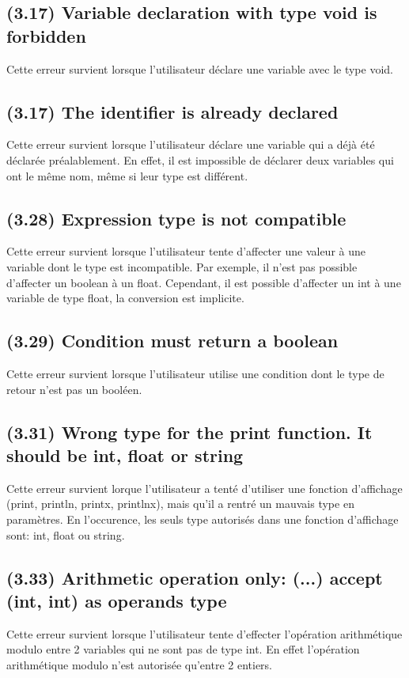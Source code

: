 \documentclass[12pt, a4paper, one side]{article}
\begin{document}
\subsection{(3.17) Variable declaration with type void is forbidden}
Cette erreur survient lorsque l'utilisateur déclare une variable avec le type void.

\subsection{(3.17) The identifier is already declared}
Cette erreur survient lorsque l'utilisateur déclare une variable qui a déjà été déclarée préalablement. En effet, il est impossible de déclarer deux variables qui ont le même nom, même si leur type est différent.

\subsection{(3.28) Expression type is not compatible}
Cette erreur survient lorsque l'utilisateur tente d'affecter une valeur à une variable dont le type est incompatible. Par exemple, il n'est pas possible d'affecter un boolean à un float. Cependant, il est possible d'affecter un int à une variable de type float, la conversion est implicite.

\subsection{(3.29) Condition must return a boolean}
Cette erreur survient lorsque l'utilisateur utilise une condition dont le type de retour n'est pas un booléen.

\subsection{(3.31) Wrong type for the print function. It should be int, float or string}
Cette erreur survient lorque l'utilisateur a tenté d'utiliser une fonction d'affichage (print, println, printx, printlnx),
mais qu'il a rentré un mauvais type en paramètres. En l'occurence, les seuls type autorisés dans une
fonction d'affichage sont: int, float ou string.

\subsection{(3.33) Arithmetic operation only: (...) accept (int, int) as operands type}
Cette erreur survient lorsque l'utilisateur tente d'effecter l'opération arithmétique modulo entre 2 variables qui ne sont pas de type int. En effet l'opération arithmétique modulo n'est autorisée qu'entre 2 entiers.
\end{document}
